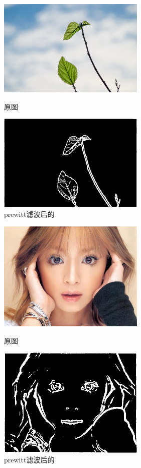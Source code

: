 \documentclass[11pt, a4paper, UTF8]{ctexart}
\begin{document}
\begin{figure}[H]
  \centering
  \begin{minipage}[t]{0.48\textwidth}
  \centering
  \includegraphics[width=7cm]{leaf.jpg}
  \caption{原图}
  \end{minipage}
  \begin{minipage}[t]{0.48\textwidth}
  \centering
  \includegraphics[width=7cm]{prewitt_all_leaf.png}
  \caption{prewitt滤波后的}
  \end{minipage}
\end{figure}


\begin{figure}[H]
  \centering
  \begin{minipage}[t]{0.48\textwidth}
  \centering
  \includegraphics[width=7cm]{ayu.jpg}
  \caption{原图}
  \end{minipage}
  \begin{minipage}[t]{0.48\textwidth}
  \centering
  \includegraphics[width=7cm]{prewitt_all_ayu.png}
  \caption{prewitt滤波后的}
  \end{minipage}
\end{figure}
\end{document}
